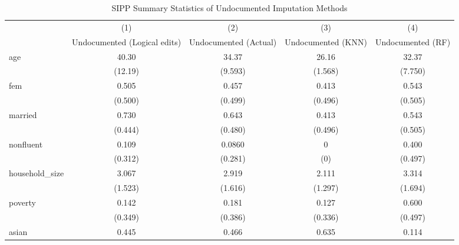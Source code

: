 \begin{table}[htbp]\centering
\def\sym#1{\ifmmode^{#1}\else\(^{#1}\)\fi}
\caption{SIPP Summary Statistics of Undocumented Imputation Methods \label{tab:sum}}
\begin{tabular}{l*{4}{c}}
\hline\hline
                    &\multicolumn{1}{c}{(1)}         &\multicolumn{1}{c}{(2)}         &\multicolumn{1}{c}{(3)}         &\multicolumn{1}{c}{(4)}         \\
                    &Undocumented (Logical edits)         &Undocumented (Actual)         &Undocumented (KNN)         &Undocumented (RF)         \\
\hline
age                 &       40.30         &       34.37         &       26.16         &       32.37         \\
                    &     (12.19)         &     (9.593)         &     (1.568)         &     (7.750)         \\
[1em]
fem                 &       0.505         &       0.457         &       0.413         &       0.543         \\
                    &     (0.500)         &     (0.499)         &     (0.496)         &     (0.505)         \\
[1em]
married             &       0.730         &       0.643         &       0.413         &       0.543         \\
                    &     (0.444)         &     (0.480)         &     (0.496)         &     (0.505)         \\
[1em]
nonfluent           &       0.109         &      0.0860         &           0         &       0.400         \\
                    &     (0.312)         &     (0.281)         &         (0)         &     (0.497)         \\
[1em]
household\_size      &       3.067         &       2.919         &       2.111         &       3.314         \\
                    &     (1.523)         &     (1.616)         &     (1.297)         &     (1.694)         \\
[1em]
poverty             &       0.142         &       0.181         &       0.127         &       0.600         \\
                    &     (0.349)         &     (0.386)         &     (0.336)         &     (0.497)         \\
[1em]
asian               &       0.445         &       0.466         &       0.635         &       0.114         \\

\end{tabular}
\end{table}
